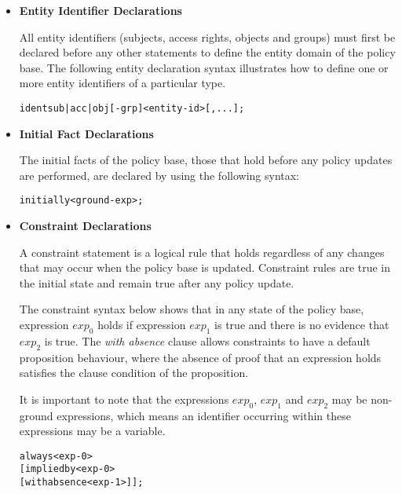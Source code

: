 \documentclass[11pt]{report}
\newenvironment{vverbatim}
{
  \begin{alltt}
}
{
    \vspace{-\baselineskip}
  \end{alltt}
}
\begin{document}
        \begin{itemize}
          \item
            {\bf Entity Identifier Declarations}

            All entity identifiers (subjects, access rights, objects and
            groups) must first be declared before any other statements to
            define the entity domain of the policy base. The following entity
            declaration syntax illustrates how to define one or more entity
            identifiers of a particular type.

            \begin{vverbatim}
  ident sub|acc|obj[-grp] <entity-id>[, ...];
            \end{vverbatim}

          \item
            {\bf Initial Fact Declarations}

            The initial facts of the policy base, those that hold before any
            policy updates are performed, are declared by using the following
            syntax:

            \begin{vverbatim}
  initially <ground-exp>;
            \end{vverbatim}

          \item
            {\bf Constraint Declarations}

            A constraint statement is a logical rule that holds regardless
            of any changes that may occur when the policy base is updated.
            Constraint rules are true in the initial state and remain true
            after any policy update.

            The constraint syntax below shows that in any state of the policy
            base, expression $exp_0$ holds if expression $exp_1$ is true and
            there is no evidence that $exp_2$ is true. The {\em with absence}
            clause allows constraints to have a default proposition
            behaviour, where the absence of proof that an expression holds
            satisfies the clause condition of the proposition.

            It is important to note that the expressions $exp_0$, $exp_1$ and
            $exp_2$ may be non-ground expressions, which means an identifier
            occurring within these expressions may be a variable.

            \begin{vverbatim}
  always <exp-0>
    [implied by <exp-0>
    [with absence <exp-1>]];
            \end{vverbatim}


\end{itemize}
\end{document}
